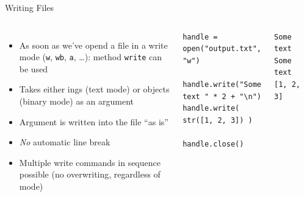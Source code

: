 \begin{frame}[fragile]{Writing Files}
%
\begin{columns}[T]
\begin{itemize}
\item As soon as we've opend a file in a write mode (\texttt{w}, \texttt{wb}, \texttt{a}, \ldots): method \texttt{write} can be used
\item Takes either ings (text mode) or  objects (binary mode) as an argument
\item Argument is written into the file \enquote{as is}
\item \emph{No} automatic line break
\item Multiple write commands in sequence possible (no overwriting, regardless of mode)
\end{itemize}
%
\begin{codebox}
\begin{verbatim}
handle = open("output.txt", "w")

handle.write("Some text " * 2 + "\n")
handle.write( str([1, 2, 3]) )

handle.close()
\end{verbatim}
\end{codebox}
%
\begin{cmdbox}
\begin{verbatim}
Some text Some text
[1, 2, 3]
\end{verbatim}
\end{cmdbox}
\end{columns}
%
\end{frame}



